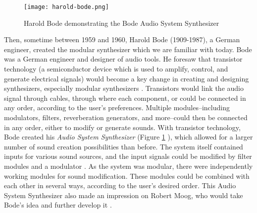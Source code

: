 \begin{figure}
  \centering
  \texttt{[image: harold-bode.png]}
  \caption{Harold Bode demonstrating the Bode Audio System Synthesizer}
  \label{fig:harold-bode}
\end{figure}


Then, sometime between 1959 and 1960, Harold Bode (1909-1987), a German engineer, created the modular synthesizer which we are familiar with today. Bode was a German engineer and designer of audio tools. He foresaw that transistor technology (a semiconductor device which is used to amplify, control, and generate electrical signals) would become a key change in creating and designing synthesizers, especially modular synthesizers \cite{Gabrielli_2020}. Transistors would link the audio signal through cables, through where each component, or  could be connected in any order, according to the user's preferences. Multiple modules--including modulators, filters, reverberation generators, and more--could then be connected in any order, either to modify or generate sounds. With transistor technology, Bode created his \textit{Audio System Synthesizer} (Figure \ref{fig:harold-bode} \cite{Crab_2019b}), which allowed for a larger number of sound creation possibilities than before. The system itself contained inputs for various sound sources, and the input signals could be modified by filter modules and a modulator \cite{Bode_1984}. As the system was modular, there were independently working modules for sound modification. These modules could be combined with each other in several ways, according to the user's desired order. This Audio System Synthesizer also made an impression on Robert Moog, who would take Bode's idea and further develop it \cite{Gabrielli_2020}. 

